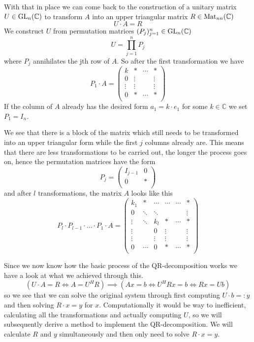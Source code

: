 With that in place we can come back to the construction of a unitary matrix \(U \in \operatorname{GL}_n(\mathbb{C})\) to transform \(A\) into an upper triangular matrix \(R \in \operatorname{Mat}_{nn}(\mathbb{C})\)
\[U \cdot A = R\]
We construct \(U\) from permutation matrices \((P_j)_{j = 1}^n \in \operatorname{GL}_n(\mathbb{C})\)
\[U = \prod_{j=1}^n P_j\]
where \(P_j\) annihilates the jth row of \(A\).
So after the first transformation we have
\[P_1 \cdot A = \begin{pmatrix}k & \ast & \cdots & \ast\\0 & \vdots & & \vdots\\ \vdots & \vdots & & \vdots\\ 0 & \ast & \cdots & \ast\\\end{pmatrix}\]
If the column of \(A\) already has the desired form \(a_1 = k \cdot e_1\) for some \(k \in \mathbb{C}\) we set \(P_1 = I_n\).

We see that there is a block of the matrix which still needs to be transformed into an upper triangular form while the first \(j\) columns already are.
This means that there are less transformations to be carried out, the longer the process goes on, hence the permutation matrices have the form
\[P_j = \left(\begin{array}{c|c}I_{j-1} & 0 \\ \hline 0 & \ast\\\end{array}\right)\]
and after \(l\) transformations, the matrix \(A\) looks like this
\[P_l \cdot P_{l-1} \cdot \ldots \cdot P_1 \cdot A = \begin{pmatrix}
      k_1 & \ast & \cdots & \cdots & \cdots & \ast\\
      0 & \ddots & \ddots & & & \vdots \\
      \vdots & \ddots & k_l & \ast & \cdots & \ast\\
      \vdots & & 0 & \vdots & & \vdots \\
      \vdots & & \vdots & \vdots & & \vdots \\
      0 & \cdots & 0 & \ast & \cdots & \ast \\
\end{pmatrix}\]

Since we now know how the basic process of the QR-decomposition works we have a look at what we achieved through this.
\[(U \cdot A = R \iff A = U^HR) \implies (Ax = b \iff U^HRx = b \iff Rx = Ub)\]
so we see that we can solve the original system through first computing \(U \cdot b =: y\) and then solving \(R \cdot x = y\) for \(x\).
Computationally it would be way to inefficient, calculating all the transformations and actually computing \(U\), so we will subsequently derive a method to implement the QR-decomposition.
We will calculate \(R\) and \(y\) simultaneously and then only need to solve \(R \cdot x = y\).

